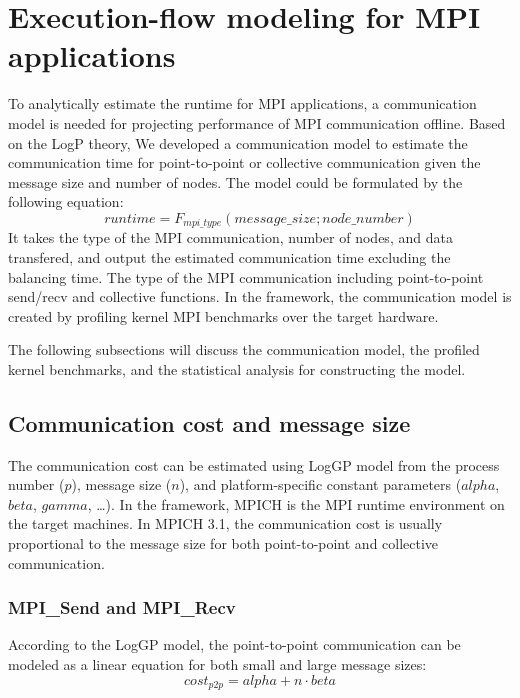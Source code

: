 
\section{Execution-flow modeling for MPI applications}
\label{sec:mpi:exeflow}

To analytically estimate the runtime for MPI applications,
a communication model is needed for projecting performance of MPI communication offline.
Based on the LogP theory,
We developed a communication model
to estimate the communication time for point-to-point or collective communication
given the message size and number of nodes.
The model could be formulated by the following equation:
\begin{equation}
runtime = F_{mpi\_type}(message\_size; node\_number)
\end{equation}
It takes the type of the MPI communication,
number of nodes, and data transfered,
and output the estimated communication time
excluding the balancing time.
The type of the MPI communication including point-to-point send/recv and collective functions.
In the framework, the communication model is created by profiling kernel MPI benchmarks over the target hardware.

The following subsections will discuss the communication model, the profiled kernel benchmarks,
and the statistical analysis for constructing the model.

\subsection{Communication cost and message size}
The communication cost can be estimated using LogGP model from
the process number ($p$),
message size ($n$),
and platform-specific constant parameters ($alpha$, $beta$, $gamma$, \ldots).
In the framework, MPICH is the MPI runtime environment on the target machines.
In MPICH 3.1,
the communication cost is usually proportional to the message size for both point-to-point and collective communication.

\subsubsection{MPI\_Send and MPI\_Recv}
According to the LogGP model, the point-to-point communication can be modeled as a linear equation for both small and large message sizes:
\begin{equation}
cost_{p2p} = alpha + n\cdot beta
\end{equation}

